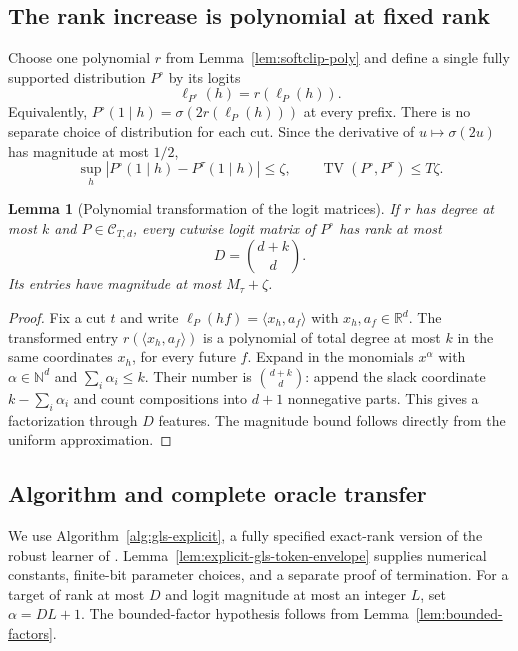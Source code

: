 \documentclass[11pt]{article}
\newcommand{\TV}{\operatorname{TV}}
\newtheorem{lemma}[theorem]{Lemma}
\theoremstyle{definition}
\theoremstyle{remark}
\begin{document}
\subsection{The rank increase is polynomial at fixed rank}

Choose one polynomial $r$ from Lemma~\ref{lem:softclip-poly} and define a single fully supported distribution $P^\circ$ by its logits
\[
\ell_{P^\circ}(h)=r(\ell_P(h)).
\]
Equivalently, $P^\circ(1\mid h)=\sigma(2r(\ell_P(h)))$ at every prefix. There is no separate choice of distribution for each cut. Since the derivative of $u\mapsto\sigma(2u)$ has magnitude at most $1/2$,
\begin{equation}\label{eq:smoothed-polynomial-tv}
\sup_h|P^\circ(1\mid h)-P^\tau(1\mid h)|\le\zeta,
\qquad
\TV(P^\circ,P^\tau)\le T\zeta.
\end{equation}

\begin{lemma}[Polynomial transformation of the logit matrices]\label{lem:logit-lift}
If $r$ has degree at most $k$ and $P\in\mathcal C_{T,d}$, every cutwise logit matrix of $P^\circ$ has rank at most
\[
D=\binom{d+k}{d}.
\]
Its entries have magnitude at most $M_\tau+\zeta$.
\end{lemma}
\begin{proof}
Fix a cut $t$ and write $\ell_P(hf)=\langle x_h,a_f\rangle$ with $x_h,a_f\in\mathbb R^d$. The transformed entry $r(\langle x_h,a_f\rangle)$ is a polynomial of total degree at most $k$ in the same coordinates $x_h$, for every future $f$. Expand in the monomials $x^\alpha$ with $\alpha\in\mathbb N^d$ and $\sum_i\alpha_i\le k$. Their number is $\binom{d+k}{d}$: append the slack coordinate $k-\sum_i\alpha_i$ and count compositions into $d+1$ nonnegative parts. This gives a factorization through $D$ features. The magnitude bound follows directly from the uniform approximation.
\end{proof}

\subsection{Algorithm and complete oracle transfer}

We use Algorithm~\ref{alg:gls-explicit}, a fully specified exact-rank version of the robust learner of \citet{gls2}. Lemma~\ref{lem:explicit-gls-token-envelope} supplies numerical constants, finite-bit parameter choices, and a separate proof of termination. For a target of rank at most $D$ and logit magnitude at most an integer $L$, set $\alpha=DL+1$. The bounded-factor hypothesis follows from Lemma~\ref{lem:bounded-factors}.
\end{document}
